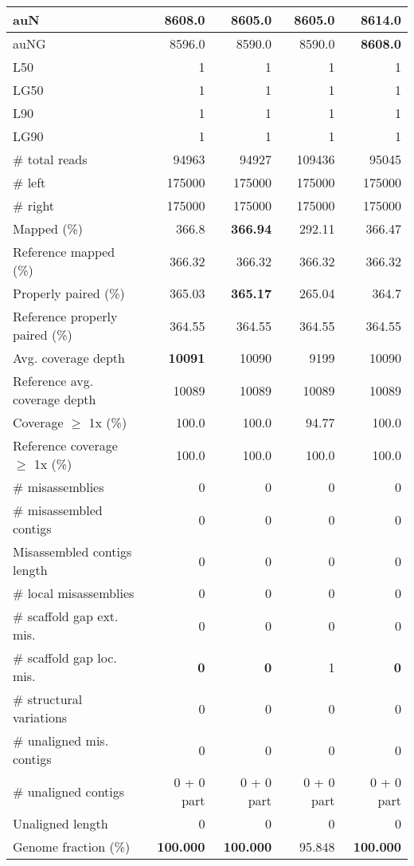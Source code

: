 \documentclass[12pt,a4paper]{article}
\begin{document}
\begin{table}[ht]
\begin{center}
\begin{tabular}{|l*{4}{|r}|}
auN & 8608.0 & 8605.0 & 8605.0 & {\bf 8614.0} \\ \hline
auNG & 8596.0 & 8590.0 & 8590.0 & {\bf 8608.0} \\ \hline
L50 & 1 & 1 & 1 & 1 \\ \hline
LG50 & 1 & 1 & 1 & 1 \\ \hline
L90 & 1 & 1 & 1 & 1 \\ \hline
LG90 & 1 & 1 & 1 & 1 \\ \hline
\# total reads & 94963 & 94927 & 109436 & 95045 \\ \hline
\# left & 175000 & 175000 & 175000 & 175000 \\ \hline
\# right & 175000 & 175000 & 175000 & 175000 \\ \hline
Mapped (\%) & 366.8 & {\bf 366.94} & 292.11 & 366.47 \\ \hline
Reference mapped (\%) & 366.32 & 366.32 & 366.32 & 366.32 \\ \hline
Properly paired (\%) & 365.03 & {\bf 365.17} & 265.04 & 364.7 \\ \hline
Reference properly paired (\%) & 364.55 & 364.55 & 364.55 & 364.55 \\ \hline
Avg. coverage depth & {\bf 10091} & 10090 & 9199 & 10090 \\ \hline
Reference avg. coverage depth & 10089 & 10089 & 10089 & 10089 \\ \hline
Coverage $\geq$ 1x (\%) & 100.0 & 100.0 & 94.77 & 100.0 \\ \hline
Reference coverage $\geq$ 1x (\%) & 100.0 & 100.0 & 100.0 & 100.0 \\ \hline
\# misassemblies & 0 & 0 & 0 & 0 \\ \hline
\# misassembled contigs & 0 & 0 & 0 & 0 \\ \hline
Misassembled contigs length & 0 & 0 & 0 & 0 \\ \hline
\# local misassemblies & 0 & 0 & 0 & 0 \\ \hline
\# scaffold gap ext. mis. & 0 & 0 & 0 & 0 \\ \hline
\# scaffold gap loc. mis. & {\bf 0} & {\bf 0} & 1 & {\bf 0} \\ \hline
\# structural variations & 0 & 0 & 0 & 0 \\ \hline
\# unaligned mis. contigs & 0 & 0 & 0 & 0 \\ \hline
\# unaligned contigs & 0 + 0 part & 0 + 0 part & 0 + 0 part & 0 + 0 part \\ \hline
Unaligned length & 0 & 0 & 0 & 0 \\ \hline
Genome fraction (\%) & {\bf 100.000} & {\bf 100.000} & 95.848 & {\bf 100.000} \\ \hline

\end{tabular}
\end{center}
\end{table}
\end{document}
